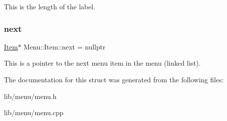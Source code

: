 This is the length of the label. \hypertarget{struct_menu_1_1_item_aadcc1e4e824296c6b72ac7d053f06869}{}\label{struct_menu_1_1_item_aadcc1e4e824296c6b72ac7d053f06869} 
\subsubsection{\texorpdfstring{next}{next}}
{\footnotesize\ttfamily \hyperlink{struct_menu_1_1_item}{Item}$\ast$ Menu\+::\+Item\+::next = nullptr}

This is a pointer to the next menu item in the menu (linked list). 

The documentation for this struct was generated from the following files\+:\begin{DoxyCompactItemize}
\item 
lib/menu/menu.\+h\item 
lib/menu/menu.\+cpp\end{DoxyCompactItemize}
